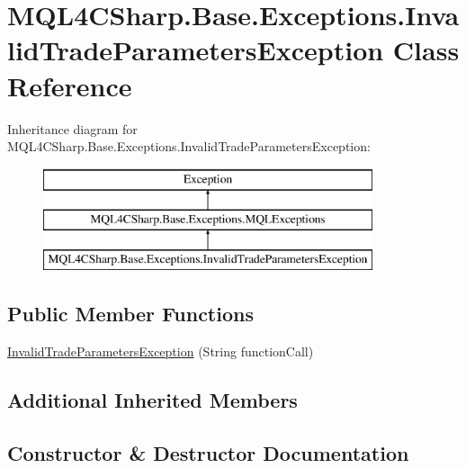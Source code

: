 \hypertarget{class_m_q_l4_c_sharp_1_1_base_1_1_exceptions_1_1_invalid_trade_parameters_exception}{}\section{M\+Q\+L4\+C\+Sharp.\+Base.\+Exceptions.\+Invalid\+Trade\+Parameters\+Exception Class Reference}
\label{class_m_q_l4_c_sharp_1_1_base_1_1_exceptions_1_1_invalid_trade_parameters_exception}
Inheritance diagram for M\+Q\+L4\+C\+Sharp.\+Base.\+Exceptions.\+Invalid\+Trade\+Parameters\+Exception\+:\begin{figure}[H]
\begin{center}
\leavevmode
\includegraphics[height=3.000000cm]{class_m_q_l4_c_sharp_1_1_base_1_1_exceptions_1_1_invalid_trade_parameters_exception}
\end{center}
\end{figure}
\subsection*{Public Member Functions}
\begin{DoxyCompactItemize}
\item 
\hyperlink{class_m_q_l4_c_sharp_1_1_base_1_1_exceptions_1_1_invalid_trade_parameters_exception_afcaef77a374a3cd4f336953ff9f466a2}{Invalid\+Trade\+Parameters\+Exception} (String function\+Call)
\end{DoxyCompactItemize}
\subsection*{Additional Inherited Members}


\subsection{Constructor \& Destructor Documentation}

